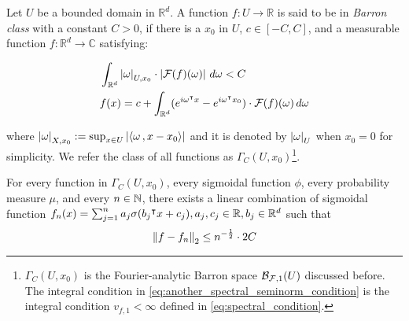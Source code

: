 \begin{definition}
    \label{def:fourier_class}
    Let $U$ be a bounded domain in $\mathbb{R}^d$. A function $f: U \to
    \mathbb{R}$ is said to be in \textit{Barron class} with a constant $C > 0$,
    if there is a $x_0$ in $U$, $c \in [-C, C]$, and a measurable function $f:
    \mathbb{R}^d \to \mathbb{C}$ satisfying:

    \begin{align}
        & \int_{\mathbb{R}^d} \left| \omega \right|_{U, x_0} 
        \cdot \left| \mathcal{F}(f)(\omega) \right| \,d\omega < C 
        \label{eq:another_spectral_seminorm_condition} \\
        & f(x) = c + \int_{\mathbb{R}^d} (
            e^{i\omega{}^{\intercal} x} - e^{i\omega{}^{\intercal} x_0}
        ) \cdot \mathcal{F}(f)(\omega)\,d\omega
    \end{align}

    where $\left| \omega \right|_{X, x_0} := \sup_{x\in U}\left| \left\langle \omega\, , x - x_0 \right\rangle \right|$
    and it is denoted by $\left| \omega \right|_U$ when $x_0 = 0$ for simplicity. We
    refer the class of all functions as $\Gamma_C(U, x_0)$\footnote{
        $\Gamma_C(U, x_0)$ is the Fourier-analytic Barron space
        $\mathcal{B}_{\mathcal{F}, 1}(U)$ discussed before. The integral condition in
        \eqref{eq:another_spectral_seminorm_condition} is the integral condition
        $v_{f,1} < \infty$ defined in \eqref{eq:spectral_condition}.
    }.
\end{definition}

\begin{theorem}
    \label{thm:barron_1993_1}
    For every function in $\Gamma_C(U, x_0)$, every sigmoidal function $\phi$,
    every probability measure $\mu$, and every $n \in \mathbb{N}$, there exists a
    linear combination of sigmoidal function $f_n(x) = \sum_{j=1}^n a_j
    \sigma(b_j{}^{\intercal} x+c_j), a_j, c_j \in \mathbb{R}, b_j \in \mathbb{R}^d$ such that
    \begin{equation}
        \left\| f - f_n \right\|_2 \leq n^{-\frac{1}{2}} \cdot 2C
    \end{equation}
\end{theorem}

